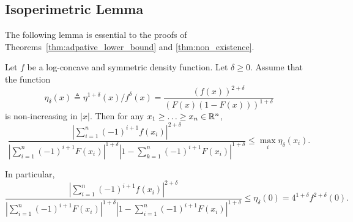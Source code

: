 
\subsection{Isoperimetric Lemma}
\label{sec:bound_intervals_delta}

The following lemma is essential to the proofs
of Theorems~\ref{thm:adpative_lower_bound} and
\ref{thm:non_existence}.

\begin{lem}
  \label{lem:bound_intervals_delta}
  Let $f$ be a log-concave and symmetric density
  function. Let $\delta\geq 0$. Assume that the function
  \begin{equation*}
    \eta_\delta(x) \triangleq  \eta^{1+\delta}(x)/f^\delta(x)
    = \frac{  \left( f(x) \right)^{2+\delta}}{\left(F(x)(1-F(x))\right)^{1+\delta}}
  \end{equation*}
  is non-increasing in $|x|$. Then for any $x_1 \ge \ldots \ge x_n \in \mathbb{R}^n$,
  \begin{equation}
    \frac{ \left| \sum_{i=1}^n (-1)^{i+1} f(x_i) \right|^{2+\delta} } {\left|
      \sum_{i=1}^n (-1)^{i+1} F(x_i) \right|^{1+\delta} \left|1- \sum_{k=1}^n
      (-1)^{i+1} F(x_i) \right|^{1+\delta} } \leq \max_{i} \eta_\delta(x_i).
    \label{eq:lem_bound_intervals_delta}
  \end{equation}
\end{lem}
In particular, 
\begin{equation*}
\frac{ \left| \sum_{i=1}^n (-1)^{i+1} f(x_i) \right|^{2+\delta} }
{\left| \sum_{i=1}^n (-1)^{i+1} F(x_i) \right|^{1+\delta} \left|1- \sum_{i=1}^n (-1)^{i+1} F(x_i) \right|^{1+\delta} } 
\leq \eta_\delta(0) = 4^{1+\delta} f^{2+\delta}(0).
\end{equation*}

